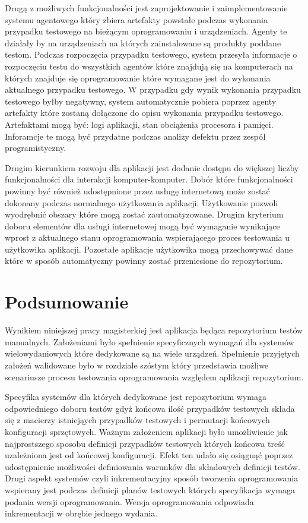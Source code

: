 Drugą z możliwych funkcjonalności jest zaprojektowanie i zaimplementowanie systemu agentowego który zbiera artefakty powstałe podczas wykonania przypadku testowego na bieżącym oprogramowaniu i urządzeniach. Agenty te działały by na urządzeniach na których zainstalowane są produkty poddane testom. Podczas rozpoczęcia przypadku testowego, system przesyła informacje o rozpoczęciu testu do wszystkich agentów które znajdują się na komputerach na których znajduje się oprogramowanie które wymagane jest do wykonania aktualnego przypadku testowego. W przypadku gdy wynik wykonania przypadku testowego byłby negatywny, system automatycznie pobiera poprzez agenty artefakty które zostaną dołączone do opisu wykonania przypadku testowego. Artefaktami mogą być: logi aplikacji, stan obciążenia procesora i pamięci. Inforamcje te mogą być przydatne podczas analizy defektu przez zespół programistyczny.

Drugim kierunkiem rozwoju dla aplikacji jest dodanie dostępu do większej liczby funkcjonalności dla interakcji komputer-komputer. Dobór które funkcjonalności powinny być również udostępnione przez usługę internetową może zostać dokonany podczas normalnego użytkowania aplikacji. Użytkowanie pozwoli wyodrębnić obszary które mogą zostać zautomatyzowane. Drugim kryterium doboru elementów dla usługi internetowej mogą być wymaganie wynikające wprost z aktualnego stanu oprogramowania wspierającego proces testowania u użytkowika aplikacji. Pozostałe aplikacje użytkowika mogą przechowywać dane które w sposób automatyczny powinny zostać przeniesione do repozytorium.



\section{Podsumowanie}

Wynikiem niniejszej pracy magisterkiej jest aplikacja będąca repozytorium testów manualnych. Założeniami było spełnienie specyficznych wymagań dla systemów wielowydaniowych które dedykowane są na wiele urządzeń. Spełnienie przyjętych założeń walidowane było w rozdziale szóstym który przedstawia możliwe scenariusze procesu testowania oprogramowania względem aplikacji repozytorium.

Specyfika systemów dla których dedykowane jest repozytorium wymaga odpowiedniego doboru testów gdyż końcowa ilość przypadków testowych składa się z macierzy istniejąych przypadków testowych i permutacji końcowych konfiguracji sprzętowych. Ważnym założeniem aplikacji było umożliwienie jak najprostszego sposobu definicji przypadków testowych których końcowa treść uzależniona jest od końcowej konfiguracji. Efekt ten udało się osiągnąć poprzez udostępnienie możliwości definiowania warunków dla składowych definicji testów. Drugi aspekt systemów czyli inkrementacyjny sposób tworzenia oprogramowania wspierany jest podczas definicji planów testowych których specyfikacja wymaga podania wersji oprogramowania. Wersja oprogramowania odpowiada inkrementacji w obrębie jednego wydania.

